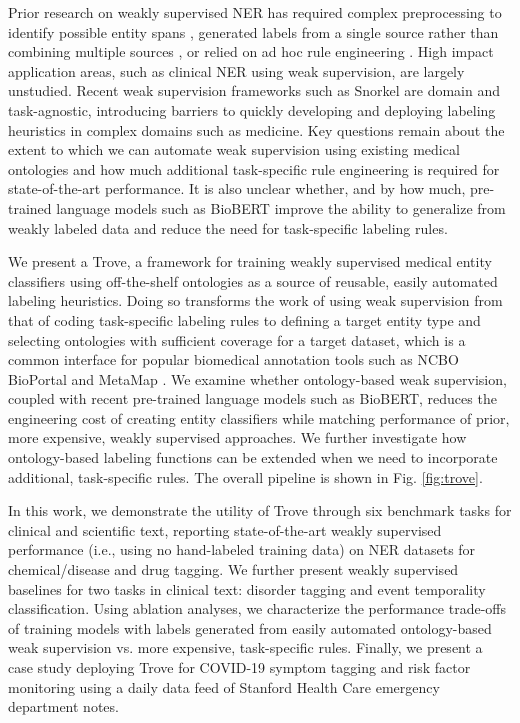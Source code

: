 \documentclass{article}
\begin{document}
Prior research on weakly supervised NER has required complex preprocessing to identify possible entity spans \cite{Fries2017-bh}, generated labels from a single source rather than combining multiple sources \cite{Shang2018-sb}, or relied on ad hoc rule engineering \cite{Safranchik2020-no}.
High impact application areas, such as clinical NER using weak supervision, are largely unstudied. 
Recent weak supervision frameworks such as Snorkel \cite{Ratner2017-rc} are domain and task-agnostic, introducing barriers to quickly developing and deploying labeling heuristics in complex domains such as medicine.
Key questions remain about the extent to which we can automate weak supervision using existing medical ontologies and how much additional task-specific rule engineering is required for state-of-the-art performance.
It is also unclear whether, and by how much, pre-trained language models such as BioBERT \cite{Lee2019-xt} improve the ability to generalize from weakly labeled data and reduce the need for task-specific labeling rules. 

We present a Trove, a framework for training weakly supervised medical entity classifiers using off-the-shelf ontologies as a source of reusable, easily automated labeling heuristics.
Doing so transforms the work of using weak supervision from that of coding task-specific labeling rules to defining a target entity type and selecting ontologies with sufficient coverage for a target dataset, which is a common interface for popular biomedical annotation tools such as NCBO BioPortal and MetaMap \cite{Jonquet2009-jx,aronson2010overview}. 
We examine whether ontology-based weak supervision, coupled with recent pre-trained language models such as BioBERT, reduces the engineering cost of creating entity classifiers while matching performance of prior, more expensive, weakly supervised approaches. 
We further investigate how ontology-based labeling functions can be extended when we need to incorporate additional, task-specific rules.
The overall pipeline is shown in Fig. \ref{fig:trove}.

In this work, we demonstrate the utility of Trove through six benchmark tasks for clinical and scientific text, reporting state-of-the-art weakly supervised performance (i.e., using no hand-labeled training data) on NER datasets for chemical/disease and drug tagging. 
We further present weakly supervised baselines for two tasks in clinical text: disorder tagging and event temporality classification.
Using ablation analyses, we characterize the performance trade-offs of training models with labels generated from easily automated ontology-based weak supervision vs. more expensive, task-specific rules.
Finally, we present a case study deploying Trove for COVID-19 symptom tagging and risk factor monitoring using a daily data feed of Stanford Health Care emergency department notes. 
\end{document}
